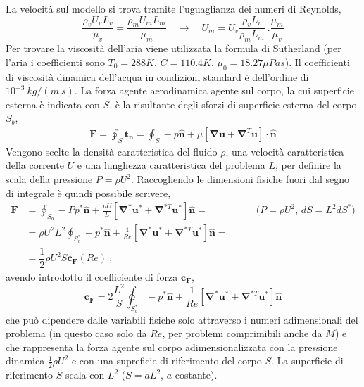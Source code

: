 \vspace{0.5cm}
\parttwo
La velocità sul modello si trova tramite l'uguaglianza dei numeri di Reynolds,
\begin{equation}
 \frac{\rho_v U_v L_v}{\mu_v} = \frac{\rho_m U_m L_m}{\mu_m} \quad 
 \rightarrow \quad U_m = U_v \frac{\rho_v L_v}{\rho_m L_m} \ .
 \frac{\mu_m}{\mu_v}
\end{equation}
Per trovare la viscosità dell'aria viene utilizzata la formula di Sutherland (per l'aria i coefficienti sono $T_0 = 288 K$, $C = 110.4 K$, $\mu_0 = 18.27 \mu Pa s$). Il coefficienti di viscosità dinamica dell'acqua in condizioni standard è dell'ordine di $10^{-3} \ kg / (m \ s)$.
%
\newline
La forza agente aerodinamica agente sul corpo, la cui superficie esterna è indicata con $S$, è la risultante degli sforzi di superficie esterna del corpo ${S_b}$,
\begin{equation}
\begin{aligned}
 \bm{F} = \oint_S \bm{t}_{\bm{n}} =  \oint_S -p \bm{\hat{n}} + \mu [\bm{\nabla} \bm{u} + \bm{\nabla}^{T} \bm{u}] \cdot \bm{\hat{n}} 
\end{aligned}
\end{equation}
Vengono scelte la densità caratteristica del fluido $\rho$, una velocità caratteristica della corrente $U$ e una lunghezza caratteristica del problema $L$, per definire la scala della pressione $P = \rho U^2$. Raccogliendo le dimensioni fisiche fuori dal segno di integrale è quindi possibile scrivere,
\begin{equation}
\begin{aligned} 
 \bm{F} & =  \oint_{S_b} -P p^*\bm{\hat{n}} + \frac{\mu U}{L} [\bm{\nabla}^*
  \bm{u}^* + \bm{\nabla}^{*T} \bm{u}^*] \bm{\hat{n}} = 
  & \qquad \text{($P = \rho U^2$, $dS = L^2 dS^*$)} \\
 & = \rho U^2 L^2 \oint_{S_b^*} - p^*\bm{\hat{n}} + \frac{1}{Re} [\bm{\nabla}^*
  \bm{u}^* + \bm{\nabla}^{*T} \bm{u}^*] \bm{\hat{n}} = \\
 & = \dfrac{1}{2}\rho U^2 S \bm{c}_{\bm{F}}(Re) \ ,
\end{aligned}
\end{equation}
avendo introdotto il coefficiente di forza $\bm{c}_{\bm{F}}$, 
\begin{equation}
 \bm{c}_{\bm{F}} = 2 \dfrac{L^2}{S} \oint_{S_b^*} - p^*\bm{\hat{n}} + \frac{1}{Re} [\bm{\nabla}^* \bm{u}^* + \bm{\nabla}^{*T} \bm{u}^*] \bm{\hat{n}}
\end{equation}
che può dipendere dalle variabili fisiche solo attraverso i numeri adimensionali del problema (in questo caso solo da $Re$, per problemi comprimibili anche da $M$) e che rappresenta la forza agente sul corpo adimensionalizzata con la pressione dinamica $\frac{1}{2}\rho U^2$ e con una supreficie di riferimento del corpo $S$. La superficie di riferimento $S$ scala con $L^2$ ($S = a L^2$, $a$ costante).
